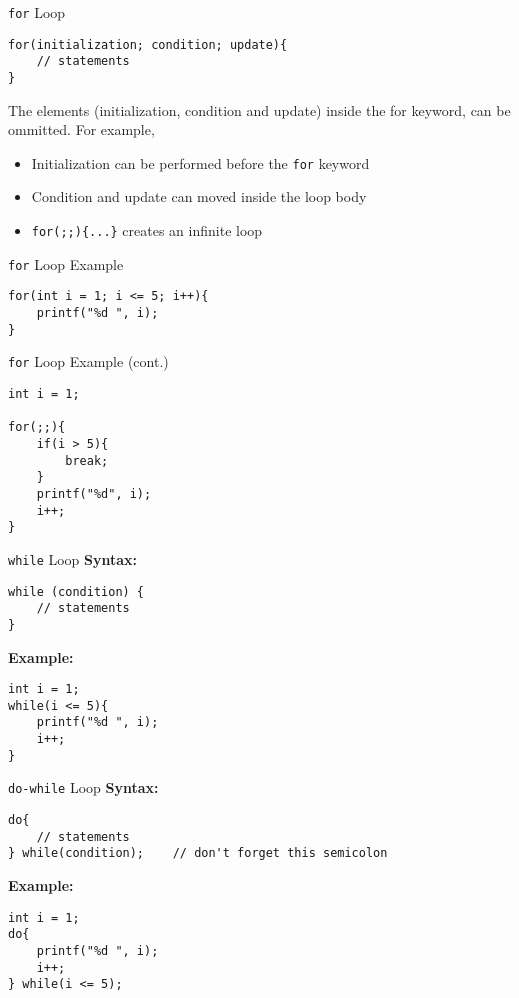 \documentclass[12pt, aspectratio=169]{beamer}
\begin{document}
    \begin{frame}[fragile]{\texttt{for} Loop}
\begin{verbatim}
for(initialization; condition; update){
    // statements
}
        \end{verbatim}

        The elements (initialization, condition and update) inside the for keyword, can be ommitted. For example,
        \begin{itemize}
            \item Initialization can be performed before the \texttt{for} keyword
            \item Condition and update can moved inside the loop body
            \item \texttt{for(;;)\{...\}} creates an infinite loop
        \end{itemize}
    \end{frame}


    \begin{frame}[fragile]{\texttt{for} Loop Example}
        \begin{verbatim}
for(int i = 1; i <= 5; i++){
    printf("%d ", i);
}
        \end{verbatim}
    \end{frame}


        \begin{frame}[fragile]{\texttt{for} Loop Example (cont.)}
        \begin{verbatim}
int i = 1;

for(;;){
    if(i > 5){
        break;
    }
    printf("%d", i);
    i++;
}
        \end{verbatim}
    \end{frame}


    \begin{frame}[fragile]{\texttt{while} Loop}
        \textbf{Syntax:}
        \begin{verbatim}
while (condition) {
    // statements
}
        \end{verbatim}

        \textbf{Example:}
        \begin{verbatim}
int i = 1;
while(i <= 5){
    printf("%d ", i);
    i++;
}
        \end{verbatim}
    \end{frame}


    \begin{frame}[fragile]{\texttt{do-while} Loop}
        \textbf{Syntax:}
        \begin{verbatim}
do{
    // statements
} while(condition);    // don't forget this semicolon
        \end{verbatim}

        \textbf{Example:}
        \begin{verbatim}
int i = 1;
do{
    printf("%d ", i);
    i++;
} while(i <= 5);
        \end{verbatim}
    \end{frame}
\end{document}
